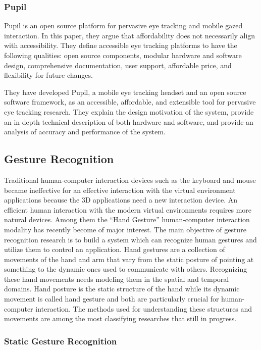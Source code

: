 \subsubsection{Pupil}
Pupil is an open source platform for pervasive eye tracking and mobile gazed interaction. In this paper, they argue that affordability does not necessarily align with accessibility. They define accessible eye tracking platforms to have the following qualities: open source components, modular hardware and software design, comprehensive documentation, user support, affordable price, and flexibility for future changes. \bigskip

They have developed Pupil, a mobile eye tracking headset and an open source software framework, as an accessible, affordable, and extensible tool for pervasive eye tracking research. They explain the design motivation of the system, provide an in depth technical description of both hardware and software, and provide an analysis of accuracy and performance of the system.
\bigskip

\subsection{Gesture Recognition}
Traditional human-computer interaction devices such as the keyboard and mouse became ineffective for an effective interaction with the virtual environment applications because the 3D applications need a new interaction device. An efficient human interaction with the modern virtual environments requires more natural devices. Among them the “Hand Gesture” human-computer interaction modality has recently become of major interest. The main objective of gesture recognition research is to build a system which can recognize human gestures and utilize them to control an application. Hand gestures are a collection of movements of the hand and arm that vary from the static posture of pointing at something to the dynamic ones used to communicate with others. Recognizing these hand movements needs modeling them in the
spatial and temporal domains. Hand posture is the static structure of the hand while its dynamic movement is called hand gesture and both are particularly crucial for human-computer interaction. The methods used for understanding these structures and movements are among the most classifying researches that still in progress.
\bigskip

\subsubsection{Static Gesture Recognition}

